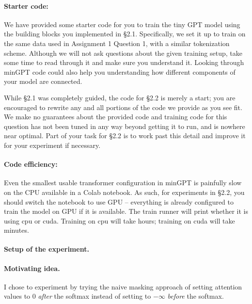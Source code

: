 \documentclass{article}
\begin{document}
    \paragraph{Starter code:}

    We have provided some starter code for you to train the tiny GPT model using
    the building blocks you implemented in \S 2.1. Specifically, we set it up to
    train on the same data used in Assignment 1 Question 1, with a similar
    tokenization scheme. Although we will not ask questions about the given
    training setup, take some time to read through it and make sure you
    understand it. Looking through minGPT code could also help you understanding
    how different components of your model are connected.

    While \S 2.1 was completely guided, the code for \S 2.2 is merely a start;
    you are encouraged to rewrite any and all portions of the code we provide as
    you see fit. We make no guarantees about the provided code and training code
    for this question has not been tuned in any way beyond getting it to run,
    and is nowhere near optimal. Part of your task for \S 2.2 is to work past
    this detail and improve it for your experiment if necessary. 

    \paragraph{Code efficiency:}
    Even the smallest usable transformer configuration in minGPT is painfully
    slow on the CPU available in a Colab notebook. As such, for experiments in
    \S 2.2, you should switch the notebook to use GPU -- everything is already
    configured to train the model on GPU if it is available. The train runner
    will print whether it is using cpu or cuda. Training on cpu will take hours;
    training on cuda will take minutes.

\newpage

\paragraph{Setup of the experiment.}

\paragraph{Motivating idea.} I chose to experiment by trying the naive masking
approach of setting attention values to 0 \textit{after} the softmax instead of
setting to $-\infty$ \textit{before} the softmax.
\end{document}
